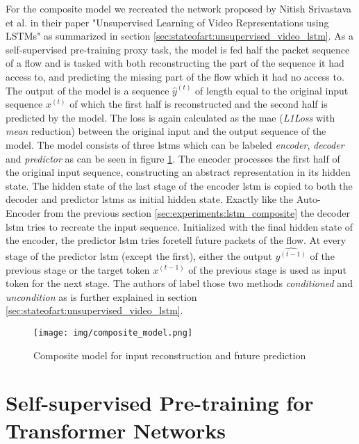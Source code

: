 For the composite model we recreated the network proposed by Nitish Srivastava et al. in their paper "Unsupervised Learning of Video Representations using LSTMs" \cite{unsupervised_learning_lstms} as summarized in section \ref{sec:stateofart:unsupervised_video_lstm}. As a self-supervised pre-training proxy task, the model is fed half the packet sequence of a flow and is tasked with both reconstructing the part of the sequence it had access to, and predicting the missing part of the flow which it had no access to. The output of the model is a sequence $\hat{y}^{(t)}$ of length equal to the original input sequence $x^{(t)}$ of which the first half is reconstructed and the second half is predicted by the model. The loss is again calculated as the \gls{mae} (\textit{L1Loss} with \textit{mean} reduction) between the original input and the output sequence of the model. The model consists of three \glspl{lstm} which can be labeled \textit{encoder}, \textit{decoder} and \textit{predictor} as can be seen in figure \ref{fig:experiments:unsupervised_lstm_composite}. The encoder processes the first half of the original input sequence, constructing an abstract representation in its hidden state. The hidden state of the last stage of the encoder \gls{lstm} is copied to both the decoder and predictor \glspl{lstm} as initial hidden state. Exactly like the Auto-Encoder from the previous section \ref{sec:experiments:lstm_composite} the decoder \gls{lstm} tries to recreate the input sequence. Initialized with the final hidden state of the encoder, the predictor \gls{lstm} tries foretell future packets of the flow. At every stage of the predictor \gls{lstm} (except the first), either the output $\hat{y^{(t-1)}}$ of the previous stage or the target token $x^{(t-1)}$ of the previous stage is used as input token for the next stage. The authors of \cite{unsupervised_learning_lstms} label those two methods \textit{conditioned} and \textit{uncondition} as is further explained in section \ref{sec:stateofart:unsupervised_video_lstm}.


\begin{figure}[h]
	\centering
	\texttt{[image: img/composite\_model.png]}
	\caption{Composite model for input reconstruction and future prediction}
	\label{fig:experiments:unsupervised_lstm_composite}
\end{figure}	


\section{Self-supervised Pre-training for Transformer Networks} \label{sec:experiments:transformer}

